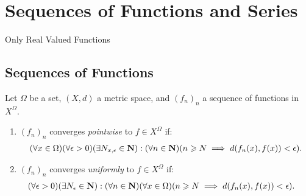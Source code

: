 \chapter{Sequences of Functions and Series}

Only Real Valued Functions

\section{Sequences of Functions}
    \begin{definition}
        Let $\Omega$ be a set, $(X,d)$ a metric space, and $(f_n)_n$ a sequence of functions in $X^\Omega$.
        \begin{enumerate}[label = (\arabic*),itemsep=1pt,topsep=3pt]
            \item $(f_n)_n$ converges \textit{pointwise} to $f \in X^\Omega$ if:
                \begin{equation*}
                \begin{split}
                    (\forall x \in \Omega)(\forall \epsilon > 0)(\exists N_{x,\epsilon} \in \mathbf{N}) : (\forall n \in \mathbf{N})( n \geqslant N \implies d(f_n(x), f(x)) < \epsilon).
                \end{split}
                \end{equation*}

            \item $(f_n)_n$ converges \textit{uniformly} to $f \in X^\Omega$ if:
                \begin{equation*}
                \begin{split}
                        (\forall \epsilon > 0)(\exists N_\epsilon \in \mathbf{N}) : (\forall n \in \mathbf{N})(\forall x \in \Omega)(n \geqslant N &\implies d(f_n(x), f(x)) < \epsilon).
                \end{split}
                \end{equation*}
        \end{enumerate}
    \end{definition}

